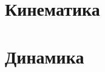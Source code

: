 




% 
% 

\newpage

\section{Кинематика}






\section{Динамика}
\setcounter{subsection}{4}
% 



% 


% 
% 

%   
% 
